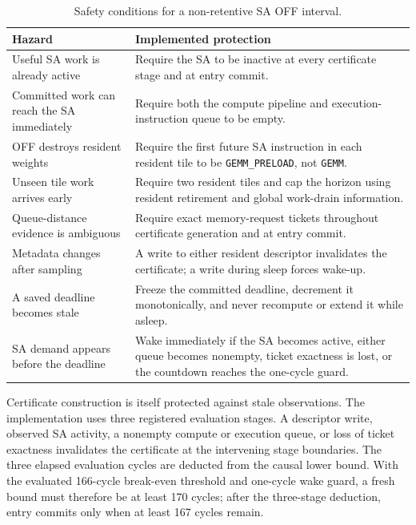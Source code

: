 \begin{table}[t]
  \centering
  \caption{Safety conditions for a non-retentive SA OFF interval.}
  \label{tab:nonretentive-safety}
  \begin{tabular}{p{}p{}}
    \toprule
    Hazard & Implemented protection \\
    \midrule
    Useful SA work is already active
      & Require the SA to be inactive at every certificate stage and at
        entry commit. \\
    Committed work can reach the SA immediately
      & Require both the compute pipeline and execution-instruction queue to
        be empty. \\
    OFF destroys resident weights
      & Require the first future SA instruction in each resident tile to be
        \texttt{GEMM\_PRELOAD}, not \texttt{GEMM}. \\
    Unseen tile work arrives early
      & Require two resident tiles and cap the horizon using resident
        retirement and global work-drain information. \\
    Queue-distance evidence is ambiguous
      & Require exact memory-request tickets throughout certificate
        generation and at entry commit. \\
    Metadata changes after sampling
      & A write to either resident descriptor invalidates the certificate;
        a write during sleep forces wake-up. \\
    A saved deadline becomes stale
      & Freeze the committed deadline, decrement it monotonically, and never
        recompute or extend it while asleep. \\
    SA demand appears before the deadline
      & Wake immediately if the SA becomes active, either queue becomes
        nonempty, ticket exactness is lost, or the countdown reaches the
        one-cycle guard. \\
    \bottomrule
  \end{tabular}
\end{table}

Certificate construction is itself protected against stale observations.
The implementation uses three registered evaluation stages.  A descriptor
write, observed SA activity, a nonempty compute or execution queue, or loss of
ticket exactness invalidates the certificate at the intervening stage
boundaries.  The three elapsed evaluation cycles are deducted from the causal
lower bound.  With the evaluated 166-cycle break-even threshold and one-cycle
wake guard, a fresh bound must therefore be at least 170 cycles; after the
three-stage deduction, entry commits only when at least 167 cycles remain.

